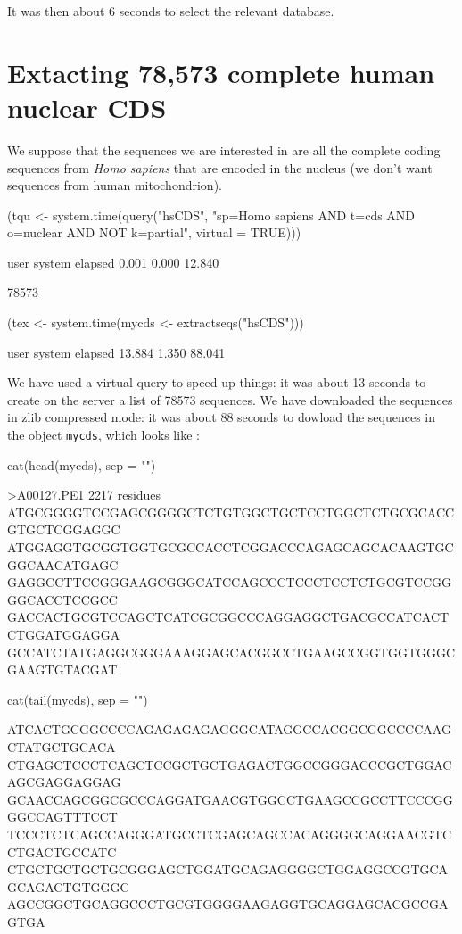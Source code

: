 \documentclass{article}
\begin{document}
It was then about 6 
seconds to select the relevant database.

\section{Extacting 78,573 complete human nuclear CDS}

We suppose that the sequences we are interested in 
are all the complete coding sequences from \textit{Homo sapiens} that
are encoded in the nucleus (we don't want sequences from human mitochondrion). 

\begin{Schunk}
\begin{Sinput}
 (tqu <- system.time(query("hsCDS", "sp=Homo sapiens AND t=cds AND o=nuclear AND NOT k=partial", 
     virtual = TRUE)))
\end{Sinput}
\begin{Soutput}
   user  system elapsed 
  0.001   0.000  12.840 
\end{Soutput}
\begin{Soutput}
[1] 78573
\end{Soutput}
\begin{Sinput}
 (tex <- system.time(mycds <- extractseqs("hsCDS")))
\end{Sinput}
\begin{Soutput}
   user  system elapsed 
 13.884   1.350  88.041 
\end{Soutput}
\end{Schunk}
 
We have used a virtual query to speed up things:
it was about 13 seconds 
to create on the server a list of 78573
sequences. We have downloaded the sequences in zlib compressed mode:
it was about 88 seconds
to dowload the sequences in the object \texttt{mycds}, which looks like :

\begin{Schunk}
\begin{Sinput}
 cat(head(mycds), sep = "\n")
\end{Sinput}
\begin{Soutput}
>A00127.PE1             2217 residues
ATGCGGGGTCCGAGCGGGGCTCTGTGGCTGCTCCTGGCTCTGCGCACCGTGCTCGGAGGC
ATGGAGGTGCGGTGGTGCGCCACCTCGGACCCAGAGCAGCACAAGTGCGGCAACATGAGC
GAGGCCTTCCGGGAAGCGGGCATCCAGCCCTCCCTCCTCTGCGTCCGGGGCACCTCCGCC
GACCACTGCGTCCAGCTCATCGCGGCCCAGGAGGCTGACGCCATCACTCTGGATGGAGGA
GCCATCTATGAGGCGGGAAAGGAGCACGGCCTGAAGCCGGTGGTGGGCGAAGTGTACGAT
\end{Soutput}
\begin{Sinput}
 cat(tail(mycds), sep = "\n")
\end{Sinput}
\begin{Soutput}
ATCACTGCGGCCCCAGAGAGAGAGGGCATAGGCCACGGCGGCCCCAAGCTATGCTGCACA
CTGAGCTCCCTCAGCTCCGCTGCTGAGACTGGCCGGGACCCGCTGGACAGCGAGGAGGAG
GCAACCAGCGGCGCCCAGGATGAACGTGGCCTGAAGCCGCCTTCCCGGGGCCAGTTTCCT
TCCCTCTCAGCCAGGGATGCCTCGAGCAGCCACAGGGGCAGGAACGTCCTGACTGCCATC
CTGCTGCTGCTGCGGGAGCTGGATGCAGAGGGGCTGGAGGCCGTGCAGCAGACTGTGGGC
AGCCGGCTGCAGGCCCTGCGTGGGGAAGAGGTGCAGGAGCACGCCGAGTGA
\end{Soutput}
\end{Schunk}
\end{document}
